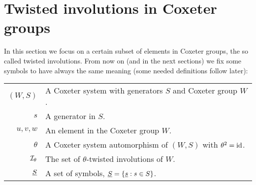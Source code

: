 \chapter[Twisted involutions]{Twisted involutions in Coxeter groups}
\label{sec:twisted-involutions}

In this section we focus on a certain subset of elements in Coxeter groups, the so called twisted involutions. From now on (and in the next sections) we fix some symbols to have always the same meaning (some needed definitions follow later):

\vspace*{1em}

\begin{tabular}{rl}
	$(W,S)$			& A Coxeter system with generators $S$ and Coxeter group $W$.\\
	$s$				& A generator in $S$.\\
	$u,v,w$			& An element in the Coxeter group $W$.\\
	$\theta$		& A Coxeter system automorphism of $(W,S)$ with $\theta^2 = \operatorname{id}$.\\
	$\mathcal{I}_{\theta}$	& The set of $\theta$-twisted involutions of $W$.\\
	$\underline{S}$			& A set of symbols, $\underline{S} = \{ \underline{s} : s \in S \}$.\\
\end{tabular}






